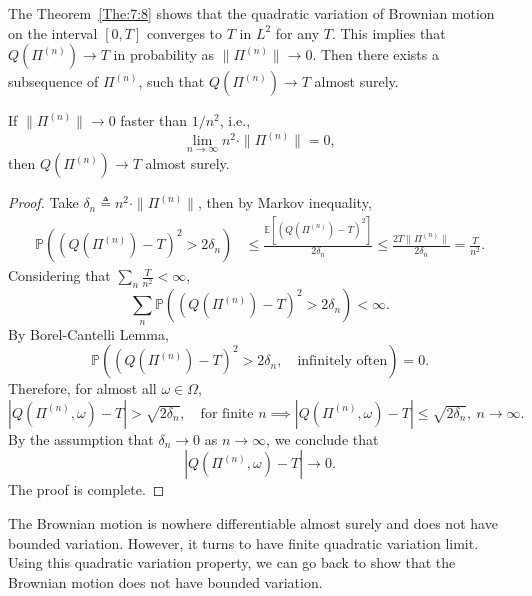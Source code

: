 \begin{remark}
The Theorem~\ref{The:7:8} shows that the quadratic variation of Brownian motion on the interval 
$[0,T]$ converges to $T$ in $L^2$ for any $T$.
This implies that $Q(\Pi^{(n)})\to T$ in probability as $\|\Pi^{(n)}\|\to0$.
Then there exists a subsequence of $\Pi^{(n)}$, such that $Q(\Pi^{(n)})\to T$ almost surely.
\end{remark}

\begin{theorem}
If $\|\Pi^{(n)}\|\to0$ faster than $1/n^2$, i.e.,
\[
\lim_{n\to\infty}n^2\cdot\|\Pi^{(n)}\|=0,
\]
then $Q(\Pi^{(n)})\to T$ almost surely.
\end{theorem}

\begin{proof}
Take $\delta_n\triangleq n^2\cdot\|\Pi^{(n)}\|$, then by Markov inequality,
\begin{align*}
\mathbb{P}\left(
(Q(\Pi^{(n)})- T)^2>2\delta_n
\right)&\le \frac{\mathbb{E}\left[(Q(\Pi^{(n)})- T)^2\right]}{2\delta_n}\le\frac{2T\|\Pi^{(n)}\|}{2\delta_n} = \frac{T}{n^2}.
\end{align*}
Considering that $\sum_n\frac{T}{n^2}<\infty$,
\[
\sum_n\mathbb{P}\left(
(Q(\Pi^{(n)})- T)^2>2\delta_n
\right)<\infty.
\]
By Borel-Cantelli Lemma,
\[
\mathbb{P}\left(
(Q(\Pi^{(n)})- T)^2>2\delta_n,\quad\text{infinitely often}
\right)=0.
\]
Therefore, for almost all $\omega\in\Omega$,
\[
|Q(\Pi^{(n)},\omega)- T|>\sqrt{2\delta_n},\quad\text{for finite $n$}\implies
|Q(\Pi^{(n)},\omega)- T|\le \sqrt{2\delta_n},~n\to\infty.
\]
By the assumption that $\delta_n\to0$ as $n\to\infty$, we conclude that 
\[
|Q(\Pi^{(n)},\omega)- T|\to0.
\]
The proof is complete.
\end{proof}

The Brownian motion is nowhere differentiable almost surely and does not have bounded variation.
However, it turns to have finite quadratic variation limit.
Using this quadratic variation property, we can go back to show that the Brownian motion does not have bounded variation.


